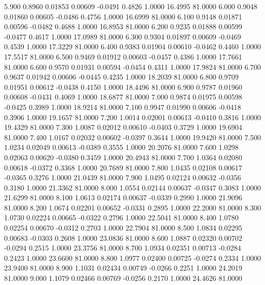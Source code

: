    5.900   0.8960   0.01853   0.00609  -0.0491   0.4826   1.0000  16.4995  81.0000
   6.000   0.9048   0.01860   0.00605  -0.0486   0.4756   1.0000  16.6999  81.0000
   6.100   0.9148   0.01871   0.00596  -0.0482   0.4688   1.0000  16.8953  81.0000
   6.200   0.9235   0.01888   0.00599  -0.0477   0.4617   1.0000  17.0989  81.0000
   6.300   0.9304   0.01897   0.00609  -0.0469   0.4539   1.0000  17.3229  81.0000
   6.400   0.9383   0.01904   0.00610  -0.0462   0.4460   1.0000  17.5517  81.0000
   6.500   0.9469   0.01912   0.00603  -0.0457   0.4386   1.0000  17.7661  81.0000
   6.600   0.9570   0.01931   0.00594  -0.0454   0.4311   1.0000  17.9824  81.0000
   6.700   0.9637   0.01942   0.00606  -0.0445   0.4235   1.0000  18.2039  81.0000
   6.800   0.9709   0.01951   0.00612  -0.0438   0.4150   1.0000  18.4496  81.0000
   6.900   0.9787   0.01960   0.00608  -0.0431   0.4069   1.0000  18.6877  81.0000
   7.000   0.9874   0.01975   0.00598  -0.0425   0.3989   1.0000  18.9214  81.0000
   7.100   0.9947   0.01990   0.00606  -0.0418   0.3906   1.0000  19.1657  81.0000
   7.200   1.0014   0.02001   0.00613  -0.0410   0.3816   1.0000  19.4329  81.0000
   7.300   1.0087   0.02012   0.00610  -0.0403   0.3729   1.0000  19.6904  81.0000
   7.400   1.0167   0.02032   0.00602  -0.0397   0.3644   1.0000  19.9420  81.0000
   7.500   1.0234   0.02049   0.00613  -0.0389   0.3555   1.0000  20.2076  81.0000
   7.600   1.0298   0.02063   0.00620  -0.0380   0.3459   1.0000  20.4943  81.0000
   7.700   1.0364   0.02080   0.00618  -0.0372   0.3368   1.0000  20.7689  81.0000
   7.800   1.0435   0.02108   0.00617  -0.0365   0.3276   1.0000  21.0439  81.0000
   7.900   1.0495   0.02124   0.00632  -0.0356   0.3180   1.0000  21.3362  81.0000
   8.000   1.0554   0.02144   0.00637  -0.0347   0.3083   1.0000  21.6299  81.0000
   8.100   1.0613   0.02174   0.00637  -0.0339   0.2990   1.0000  21.9096  81.0000
   8.200   1.0674   0.02201   0.00652  -0.0331   0.2895   1.0000  22.2000  81.0000
   8.300   1.0730   0.02224   0.00665  -0.0322   0.2796   1.0000  22.5041  81.0000
   8.400   1.0780   0.02254   0.00670  -0.0312   0.2703   1.0000  22.7904  81.0000
   8.500   1.0834   0.02295   0.00683  -0.0303   0.2608   1.0000  23.0836  81.0000
   8.600   1.0887   0.02320   0.00702  -0.0294   0.2515   1.0000  23.3756  81.0000
   8.700   1.0934   0.02351   0.00713  -0.0284   0.2423   1.0000  23.6600  81.0000
   8.800   1.0977   0.02400   0.00725  -0.0274   0.2334   1.0000  23.9400  81.0000
   8.900   1.1031   0.02434   0.00749  -0.0266   0.2251   1.0000  24.2019  81.0000
   9.000   1.1079   0.02466   0.00769  -0.0256   0.2170   1.0000  24.4626  81.0000
